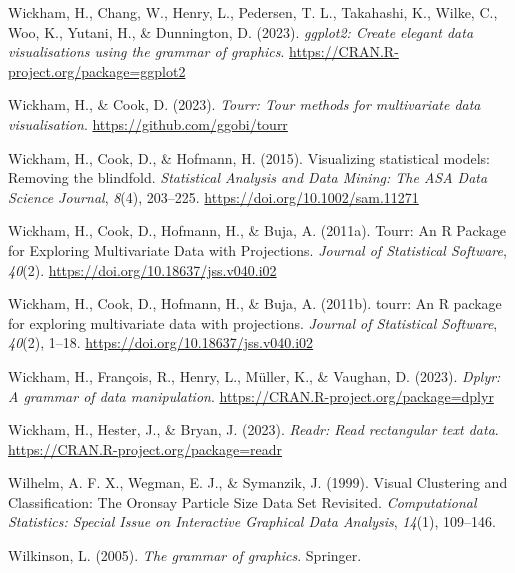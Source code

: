 \documentclass[
  letterpaper,
]{book}
\newlength{\cslhangindent}
\newlength{\cslentryspacingunit} %
\newenvironment{CSLReferences}[2] %
 {%
  \setlength{\parindent}{0pt}
  \ifodd #1
  \let\oldpar\par
  \def\par{\hangindent=\cslhangindent\oldpar}
  \fi
  \setlength{\parskip}{#2\cslentryspacingunit}
 }%
 {}
\begin{document}
\begin{CSLReferences}{1}{0}
\leavevmode{}%
Wickham, H., Chang, W., Henry, L., Pedersen, T. L., Takahashi, K.,
Wilke, C., Woo, K., Yutani, H., \& Dunnington, D. (2023). \emph{ggplot2:
Create elegant data visualisations using the grammar of graphics}.
\url{https://CRAN.R-project.org/package=ggplot2}

\leavevmode{}%
Wickham, H., \& Cook, D. (2023). \emph{Tourr: Tour methods for
multivariate data visualisation}. \url{https://github.com/ggobi/tourr}

\leavevmode{}%
Wickham, H., Cook, D., \& Hofmann, H. (2015). Visualizing statistical
models: Removing the blindfold. \emph{Statistical Analysis and Data
Mining: The ASA Data Science Journal}, \emph{8}(4), 203--225.
\url{https://doi.org/10.1002/sam.11271}

\leavevmode{}%
Wickham, H., Cook, D., Hofmann, H., \& Buja, A. (2011a). Tourr: {An} {R}
{Package} for {Exploring} {Multivariate} {Data} with {Projections}.
\emph{Journal of Statistical Software}, \emph{40}(2).
\url{https://doi.org/10.18637/jss.v040.i02}

\leavevmode{}%
Wickham, H., Cook, D., Hofmann, H., \& Buja, A. (2011b). {tourr}: An {R}
package for exploring multivariate data with projections. \emph{Journal
of Statistical Software}, \emph{40}(2), 1--18.
\url{https://doi.org/10.18637/jss.v040.i02}

\leavevmode{}%
Wickham, H., François, R., Henry, L., Müller, K., \& Vaughan, D. (2023).
\emph{Dplyr: A grammar of data manipulation}.
\url{https://CRAN.R-project.org/package=dplyr}

\leavevmode{}%
Wickham, H., Hester, J., \& Bryan, J. (2023). \emph{Readr: Read
rectangular text data}. \url{https://CRAN.R-project.org/package=readr}

\leavevmode{}%
Wilhelm, A. F. X., Wegman, E. J., \& Symanzik, J. (1999). Visual
{C}lustering and {C}lassification: {T}he {O}ronsay {P}article {S}ize
{D}ata {S}et {R}evisited. \emph{Computational Statistics: Special Issue
on Interactive Graphical Data Analysis}, \emph{14}(1), 109--146.

\leavevmode{}%
Wilkinson, L. (2005). \emph{The grammar of graphics}. Springer.


\end{CSLReferences}
\end{document}
